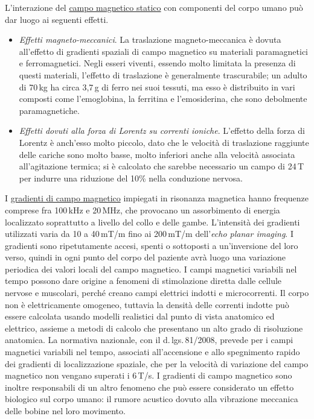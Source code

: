 \documentclass{report}
\numberwithin{equation}{section}
\numberwithin{figure}{section}
\begin{document}
L’interazione del \underline{campo magnetico statico} con componenti del corpo umano può dar luogo ai seguenti effetti.
\begin{itemize}[label=$\triangleright$]
    \item \emph{Effetti magneto-meccanici}. La traslazione magneto-meccanica è dovuta all'effetto di gradienti spaziali di campo magnetico su materiali paramagnetici e ferromagnetici. Negli esseri viventi, essendo molto limitata la presenza di questi materiali, l’effetto di traslazione è generalmente trascurabile; un adulto di 70\,kg ha circa 3,7\,g di ferro nei suoi tessuti, ma esso è distribuito in vari composti come l’emoglobina, la ferritina e l’emosiderina, che sono debolmente paramagnetiche.
    \item \emph{Effetti dovuti alla forza di Lorentz su correnti ioniche}. L’effetto della forza di Lorentz è anch'esso molto piccolo, dato che le velocità di traslazione raggiunte delle cariche sono molto basse, molto inferiori anche alla velocità associata all'agitazione termica; si è calcolato che sarebbe necessario un campo di 24\,T per indurre una riduzione del 10\% nella conduzione nervosa.
\end{itemize}

I \underline{gradienti di campo magnetico} impiegati in risonanza magnetica hanno frequenze comprese fra 100\,kHz e 20\,MHz, che provocano un assorbimento di energia localizzato soprattutto a livello del collo e delle gambe. L'intensità dei gradienti utilizzati varia da 10 a 40\,mT/m fino ai 200\,mT/m dell'\textit{echo planar imaging}. I gradienti sono ripetutamente accesi, spenti o sottoposti a un’inversione del loro verso, quindi in ogni punto del corpo del paziente avrà luogo una variazione periodica dei valori locali del campo magnetico. I campi magnetici variabili nel tempo possono dare origine a fenomeni di stimolazione diretta dalle cellule nervose e muscolari, perché creano campi elettrici indotti e microcorrenti. Il corpo non è elettricamente omogeneo, tuttavia la densità delle correnti indotte può essere calcolata usando modelli realistici dal punto di vista anatomico ed elettrico, assieme a metodi di calcolo che presentano un alto grado di risoluzione anatomica. La normativa nazionale, con il d.\,lgs.\,81/2008, prevede per i campi magnetici variabili nel tempo, associati all'accensione e allo spegnimento rapido dei gradienti di localizzazione spaziale, che per la velocità di variazione del campo magnetico non vengano superati i 6\,T/s. I gradienti di campo magnetico sono inoltre responsabili di un altro fenomeno che può essere considerato un effetto biologico sul corpo umano: il rumore acustico dovuto alla vibrazione meccanica delle bobine nel loro movimento.
\end{document}
